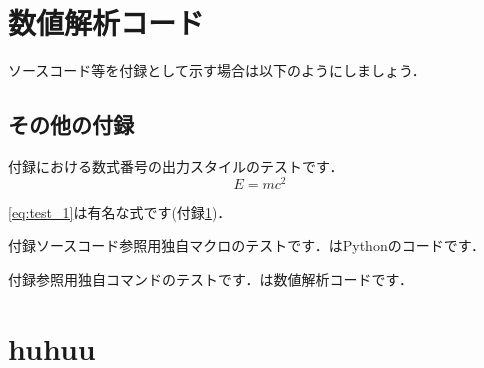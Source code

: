 \appendix
\appendixstyle
\chapter{数値解析コード}\label{appendix:code1}
ソースコード等を付録として示す場合は以下のようにしましょう．

\section{その他の付録}
付録における数式番号の出力スタイルのテストです．
\begin{equation}\label{eq:test_1}
    E=mc^2
\end{equation}

\cref{eq:test_1}は有名な式です(付録\ref{appendix:code1})．

付録ソースコード参照用独自マクロのテストです．はPythonのコードです．

付録参照用独自コマンドのテストです．は数値解析コードです．

\chapter{huhuu}